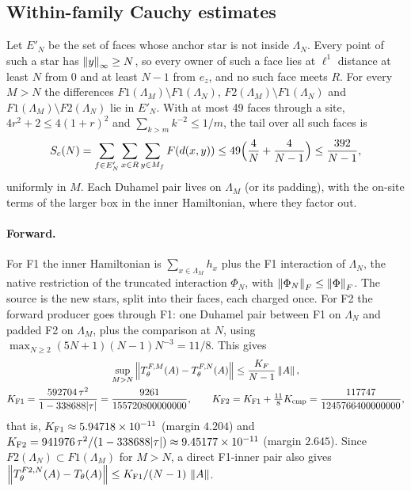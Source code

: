 \subsection{Within-family Cauchy estimates}
\label{sec:ba2-cauchy}
Let $E'_N$ be the set of faces whose anchor star is not inside $\Lambda_N$.
Every point of such a star has $\left\lVert y\right\rVert_\infty\ge N$, so every owner of such
a face lies at $\ell^1$ distance at least $N$ from $0$ and at least $N-1$
from $e_z$, and no such face meets $R$. For every $M>N$ the differences
$F1(\Lambda_M)\setminus F1(\Lambda_N)$,
$F2(\Lambda_M)\setminus F1(\Lambda_N)$ and
$F1(\Lambda_M)\setminus F2(\Lambda_N)$ lie in $E'_N$. With at most 49 faces
through a site, $4r^2+2\le4(1+r)^2$ and $\sum_{k>m}k^{-2}\le1/m$, the tail
over all such faces is
\begin{equation}
 S_c(N)=\sum_{f\in E'_N}\sum_{x\in R}\sum_{y\in M_f}F(d(x,y))
 \le49\Bigl(\frac4N+\frac4{N-1}\Bigr)\le\frac{392}{N-1},
 \label{eq:ba2-tail}
\end{equation}
uniformly in $M$. Each Duhamel pair lives on $\Lambda_M$ (or its padding),
with the on-site terms of the larger box in the inner Hamiltonian, where they
factor out.

\paragraph{Forward.} For F1 the inner Hamiltonian is
$\sum_{x\in\Lambda_M}h_x$ plus the F1 interaction of $\Lambda_N$, the native
restriction of the truncated interaction $\Phi_N$, with
$\left\lVert\Phi_N\right\rVert_F\le\left\lVert\Phi\right\rVert_F$. The source is the new stars, split into their
faces, each charged once. For F2 the forward producer goes through F1: one
Duhamel pair between F1 on $\Lambda_N$ and padded F2 on $\Lambda_M$, plus the
comparison at $N$, using $\max_{N\ge2}(5N+1)(N-1)N^{-3}=11/8$. This gives
\begin{equation}
 \begin{gathered}
 \sup_{M>N}\left\lVert T^{F,M}_\theta(A)-T^{F,N}_\theta(A)\right\rVert\le\frac{K_F}{N-1}\left\lVert A\right\rVert,\\
 K_{\rm F1}=\frac{592704\,\tau^2}{1-338688|\tau|}=\frac{9261}{155720800000000},\qquad
 K_{\rm F2}=K_{\rm F1}+\tfrac{11}{8}K_{\rm cmp}=\frac{117747}{1245766400000000},
 \end{gathered}
 \label{eq:ba2-cauchy-fwd}
\end{equation}
that is, $K_{\rm F1}\approx5.94718\times10^{-11}$ (margin $4.204$) and
$K_{\rm F2}=941976\,\tau^2/(1-338688|\tau|)\approx9.45177\times10^{-11}$
(margin $2.645$). Since $F2(\Lambda_N)\subset F1(\Lambda_M)$ for $M>N$, a
direct F1-inner pair also gives
$\left\lVert T^{F2,N}_\theta(A)-T_\theta(A)\right\rVert\le K_{\rm F1}/(N-1)\,\left\lVert A\right\rVert$.

